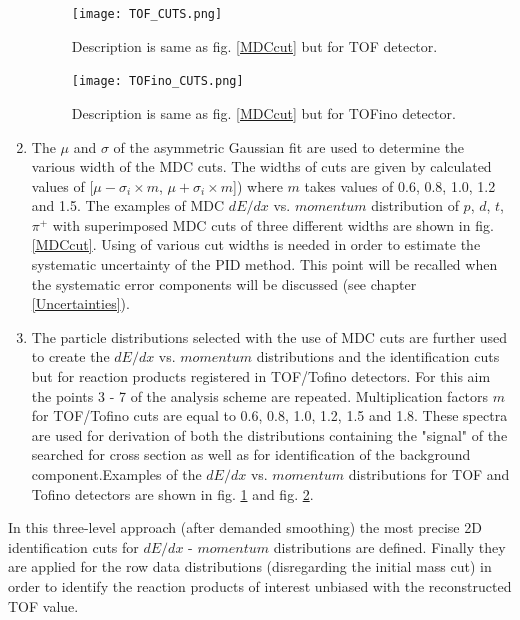 \begin{enumerate}
   \begin{figure}[!h]
   	\centering
   	\texttt{[image: TOF\_CUTS.png]}
   	\caption{Description is same as fig. \ref{MDCcut} but for TOF detector. 
    }
   	\label{TOFcut}
   \end{figure}
 

   \begin{figure}[!h]
   	\centering
   	\texttt{[image: TOFino\_CUTS.png]}
   	\caption{Description is same as fig. \ref{MDCcut} but for TOFino detector.
    }
   	\label{TOFinocut}
   \end{figure}
   \item The $\mu$ and $\sigma$ of the asymmetric Gaussian fit are used to determine the various width of the MDC cuts. 
   The widths of cuts are given by calculated values of [$\mu - \sigma_i \times m$, $\mu + \sigma_i \times m$]) 
   where $m$ takes values of 0.6, 0.8, 1.0, 1.2 and 1.5. The examples of MDC $dE/dx$ vs. $momentum$ distribution of $p$, $d$, $t$, $\pi^+$
   with superimposed MDC cuts of three different widths are shown in fig. \ref{MDCcut}. 
   Using of various cut widths is needed in order to estimate the systematic uncertainty of the PID method. This point will be recalled when
   the systematic error components will be discussed (see chapter \ref{Uncertainties}).
   
  \item The particle distributions selected with the use of MDC cuts are further used to create the $dE/dx$ vs. $momentum$ distributions 
  and the identification cuts but for reaction products registered in TOF/Tofino detectors.
  For this aim the points 3 - 7 of the analysis scheme are repeated. Multiplication factors $m$ 
  for TOF/Tofino cuts are equal to 0.6, 0.8, 1.0, 1.2, 1.5 and 1.8. 
   These spectra are used for derivation of both the distributions containing the 
  "signal" of the searched for cross section as well as for identification of the background component.Examples of the $dE/dx$ vs. $momentum$ distributions for TOF and Tofino detectors are shown 
  in fig. \ref{TOFcut} and fig. \ref{TOFinocut}. 
    
  \end{enumerate}
  
  In this three-level approach (after demanded smoothing) the most precise 2D identification cuts for $dE/dx$ - $momentum$ distributions are defined.
  Finally they are applied for the row data distributions (disregarding the initial mass cut) in order to identify the reaction products of interest
  unbiased with the reconstructed TOF value. 

